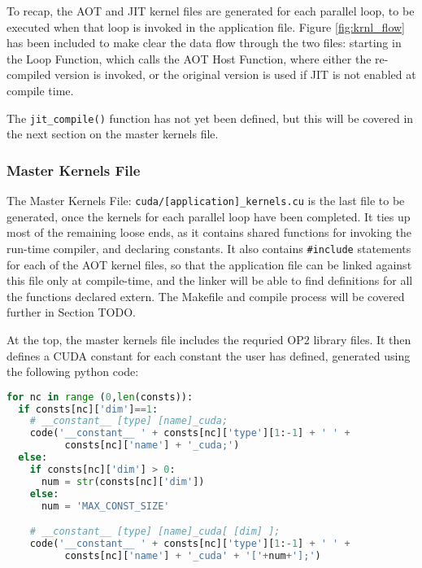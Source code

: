 \label{impl_summary}

To recap, the AOT and JIT kernel files are generated for each parallel loop, to be executed when that loop is invoked in the application file. Figure \ref{fig:krnl_flow} has been included to make clear the data flow through the two files: starting in the Loop Function, which calls the AOT Host Function, where either the re-compiled version is invoked, or the original version is used if JIT is not enabled at compile time.

The \verb|jit_compile()| function has not yet been defined, but this will be covered in the next section on the master kernels file.
\clearpage
\subsubsection{Master Kernels File}
\label{sss:mkf}
The Master Kernels File: \verb|cuda/[application]_kernels.cu| is the last file to be generated, once the kernels for each parallel loop have been completed. It ties up most of the remaining loose ends, as it contains shared functions for invoking the run-time compiler, and declaring constants. It also contains \verb|#include| statements for each of the AOT kernel files, so that the application file can be linked against this file only at compile-time, and the linker will be able to find definitions for all the functions declared extern. The Makefile and compile process will be covered further in Section TODO.
\par
At the top, the master kernels file includes the requried OP2 library files. It then defines a CUDA constant for each constant the user has defined, generated using the following python code:
\begin{lstlisting}[backgroundcolor = \color{lightgray!20}, language=Python]
for nc in range (0,len(consts)):
  if consts[nc]['dim']==1:
    # __constant__ [type] [name]_cuda;
    code('__constant__ ' + consts[nc]['type'][1:-1] + ' ' +
          consts[nc]['name'] + '_cuda;')
  else:
    if consts[nc]['dim'] > 0:
      num = str(consts[nc]['dim'])
    else:
      num = 'MAX_CONST_SIZE'

    # __constant__ [type] [name]_cuda[ [dim] ];
    code('__constant__ ' + consts[nc]['type'][1:-1] + ' ' +
          consts[nc]['name'] + '_cuda' + '['+num+'];')
\end{lstlisting}
\vspace{-1em}
